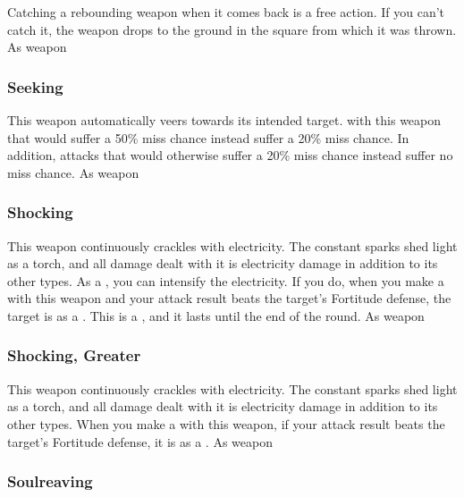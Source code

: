 Catching a rebounding weapon when it comes back is a free action.
If you can't catch it, the weapon drops to the ground in the square from which it was thrown.
 
 As weapon
\lowercase{\hypertarget{item:Seeking}{}}\label{item:Seeking}
\hypertarget{item:Seeking}{\subsubsection{Seeking\hfill{}}}
This weapon automatically veers towards its intended target.
 with this weapon that would suffer a 50\% miss chance instead suffer a 20\% miss chance.
In addition, attacks that would otherwise suffer a 20\% miss chance instead suffer no miss chance.
 
 As weapon
\lowercase{\hypertarget{item:Shocking}{}}\label{item:Shocking}
\hypertarget{item:Shocking}{\subsubsection{Shocking\hfill{}}}
This weapon continuously crackles with electricity.
The constant sparks shed light as a torch, and all damage dealt with it is electricity damage in addition to its other types.
As a , you can intensify the electricity.
If you do, when you make a  with this weapon and your attack result beats the target's Fortitude defense, the target is \dazed as a .
This is a , and it lasts until the end of the round.
 
 As weapon
\lowercase{\hypertarget{item:Shocking, Greater}{}}\label{item:Shocking, Greater}
\hypertarget{item:Shocking, Greater}{\subsubsection{Shocking, Greater\hfill{}}}
This weapon continuously crackles with electricity.
The constant sparks shed light as a torch, and all damage dealt with it is electricity damage in addition to its other types.
When you make a  with this weapon, if your attack result beats the target's Fortitude defense, it is \dazed as a .
 
 As weapon
\lowercase{\hypertarget{item:Soulreaving}{}}\label{item:Soulreaving}
\hypertarget{item:Soulreaving}{\subsubsection{Soulreaving\hfill{}}}
